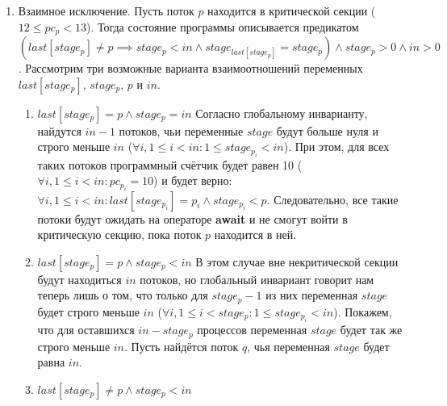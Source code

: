 \documentclass{article}
\begin{document}
\begin{enumerate}
\item Взаимное исключение. Пусть поток $ p $ находится в критической секции ($ 12 \leq pc_p < 13 $). Тогда состояние программы
      описывается предикатом $ (last[stage_p] \neq p \implies stage_p < in \land stage_{last[stage_p]} = stage_p) \land stage_p >
      0 \land in > 0 $. Рассмотрим три возможные варианта взаимоотношений переменных $ last[stage_p] $, $ stage_p $, $ p $ и
      $ in $.
      \begin{enumerate}
      \item $ last[stage_p] = p \land stage_p = in $ Согласно глобальному инварианту, найдутся $ in - 1 $ потоков, чьи переменные
            $ stage $ будут больше нуля и строго меньше $ in $ ($\forall i, 1 \leq i < in : 1 \leq stage_{p_i} < in $). При этом,
            для всех таких потоков программный счётчик будет равен 10 ($ \forall i, 1 \leq i < in : pc_{p_i} = 10 $) и будет
            верно: $ \forall i, 1 \leq i < in : last[stage_{p_i}] = p_i \land stage_{p_i} < p $.  Следовательно, все такие потоки
            будут ожидать на операторе \textbf{await} и не смогут войти в критическую секцию, пока поток $ p $ находится в ней.
      \item $ last[stage_p] = p \land stage_p < in $ В этом случае вне некритической секции будут находиться $ in $ потоков, но
            глобальный инвариант говорит нам теперь лишь о том, что только для $ stage_p - 1 $ из них переменная $ stage $ будет
            строго меньше $ in $ ($ \forall i, 1 \leq i < stage_p : 1 \leq stage_{p_i} < in $). Покажем, что для оставшихся $ in -
            stage_p $ процессов переменная $ stage $ будет так же строго меньше $ in $. Пусть найдётся поток $ q $, чья переменная
            $ stage $ будет равна $ in $.
      \item $ last[stage_p] \neq p \land stage_p < in $
      \end{enumerate}
\end{enumerate}
\end{document}
